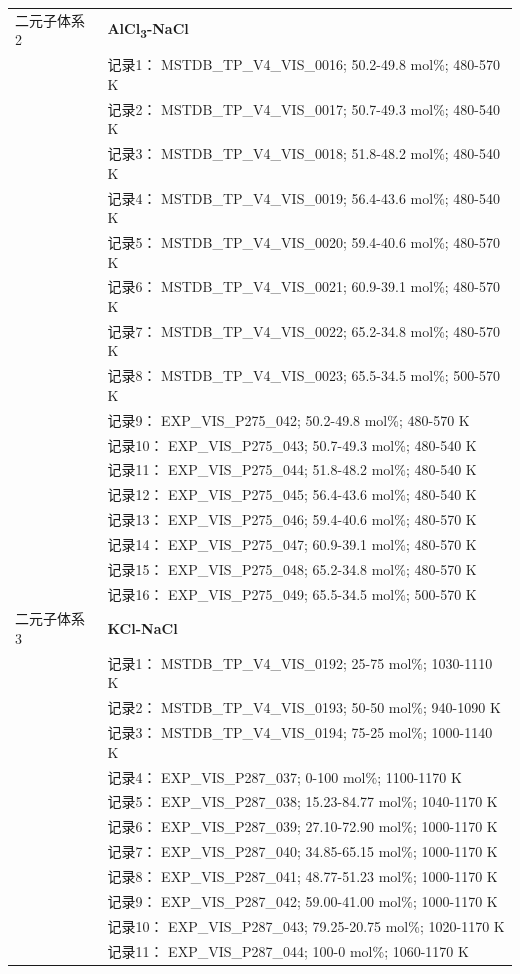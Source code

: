 \documentclass[12pt]{article}
\begin{document}
{\begin{longtable}[]{@{}
  >{\raggedright\arraybackslash}p{}
  >{\raggedright\arraybackslash}p{}@{}}
二元子体系 2  & \textbf{AlCl\textsubscript{3}-NaCl} \\
 & 记录1： MSTDB\_TP\_V4\_VIS\_0016; 50.2-49.8 mol\%; 480-570 K \\
 & 记录2： MSTDB\_TP\_V4\_VIS\_0017; 50.7-49.3 mol\%; 480-540 K \\
 & 记录3： MSTDB\_TP\_V4\_VIS\_0018; 51.8-48.2 mol\%; 480-540 K \\
 & 记录4： MSTDB\_TP\_V4\_VIS\_0019; 56.4-43.6 mol\%; 480-540 K \\
 & 记录5： MSTDB\_TP\_V4\_VIS\_0020; 59.4-40.6 mol\%; 480-570 K \\
 & 记录6： MSTDB\_TP\_V4\_VIS\_0021; 60.9-39.1 mol\%; 480-570 K \\
 & 记录7： MSTDB\_TP\_V4\_VIS\_0022; 65.2-34.8 mol\%; 480-570 K \\
 & 记录8： MSTDB\_TP\_V4\_VIS\_0023; 65.5-34.5 mol\%; 500-570 K \\
 & 记录9： EXP\_VIS\_P275\_042; 50.2-49.8 mol\%; 480-570 K \\
 & 记录10： EXP\_VIS\_P275\_043; 50.7-49.3 mol\%; 480-540 K \\
 & 记录11： EXP\_VIS\_P275\_044; 51.8-48.2 mol\%; 480-540 K \\
 & 记录12： EXP\_VIS\_P275\_045; 56.4-43.6 mol\%; 480-540 K \\
 & 记录13： EXP\_VIS\_P275\_046; 59.4-40.6 mol\%; 480-570 K \\
 & 记录14： EXP\_VIS\_P275\_047; 60.9-39.1 mol\%; 480-570 K \\
 & 记录15： EXP\_VIS\_P275\_048; 65.2-34.8 mol\%; 480-570 K \\
 & 记录16： EXP\_VIS\_P275\_049; 65.5-34.5 mol\%; 500-570 K  \\

二元子体系 3  & \textbf{KCl-NaCl} \\
 & 记录1： MSTDB\_TP\_V4\_VIS\_0192; 25-75 mol\%; 1030-1110 K \\
 & 记录2： MSTDB\_TP\_V4\_VIS\_0193; 50-50 mol\%; 940-1090 K \\
 & 记录3： MSTDB\_TP\_V4\_VIS\_0194; 75-25 mol\%; 1000-1140 K \\
 & 记录4： EXP\_VIS\_P287\_037; 0-100 mol\%; 1100-1170 K \\
 & 记录5： EXP\_VIS\_P287\_038; 15.23-84.77 mol\%; 1040-1170 K \\
 & 记录6： EXP\_VIS\_P287\_039; 27.10-72.90 mol\%; 1000-1170 K \\
 & 记录7： EXP\_VIS\_P287\_040; 34.85-65.15 mol\%; 1000-1170 K \\
 & 记录8： EXP\_VIS\_P287\_041; 48.77-51.23 mol\%; 1000-1170 K \\
 & 记录9： EXP\_VIS\_P287\_042; 59.00-41.00 mol\%; 1000-1170 K \\
 & 记录10： EXP\_VIS\_P287\_043; 79.25-20.75 mol\%; 1020-1170 K \\
 & 记录11： EXP\_VIS\_P287\_044; 100-0 mol\%; 1060-1170 K  \\


\end{longtable}}
\end{document}
